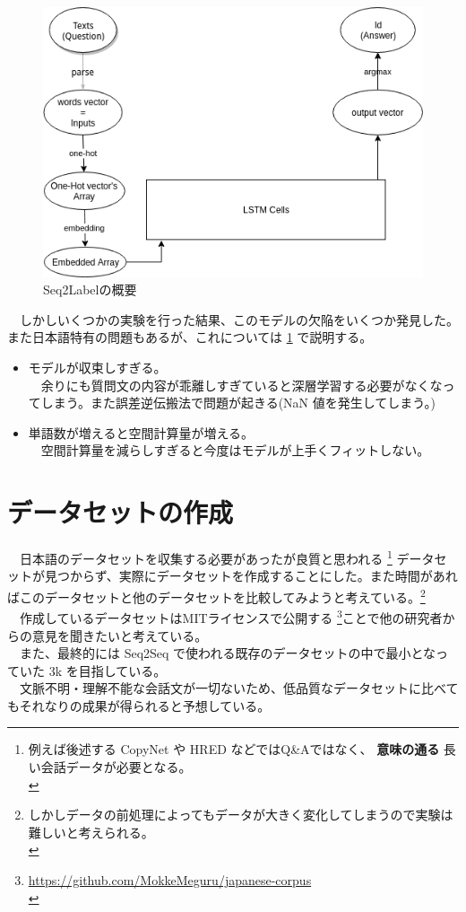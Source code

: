 \documentclass{scrartcl}
\begin{document}
\begin{figure}[htbp]
\centering
\includegraphics[width=12cm]{./Diagram.png}
\caption{\label{fig:org3d3094e}
Seq2Labelの概要}
\end{figure}

　しかしいくつかの実験を行った結果、このモデルの欠陥をいくつか発見した。また日本語特有の問題もあるが、これについては \ref{sec:orgcb39560} で説明する。\\
\begin{itemize}
\item モデルが収束しすぎる。\\
　余りにも質問文の内容が乖離しすぎていると深層学習する必要がなくなってしまう。また誤差逆伝搬法で問題が起きる(NaN 値を発生してしまう。)\\
\item 単語数が増えると空間計算量が増える。\\
　空間計算量を減らしすぎると今度はモデルが上手くフィットしない。\\
\end{itemize}

\section{データセットの作成}
\label{sec:orgcb39560}
　日本語のデータセットを収集する必要があったが良質と思われる \footnote{例えば後述する CopyNet や HRED などではQ\&Aではなく、 \textbf{意味の通る} 長い会話データが必要となる。\\} データセットが見つからず、実際にデータセットを作成することにした。また時間があればこのデータセットと他のデータセットを比較してみようと考えている。\footnote{しかしデータの前処理によってもデータが大きく変化してしまうので実験は難しいと考えられる。\\}\\
　作成しているデータセットはMITライセンスで公開する \footnote{\url{https://github.com/MokkeMeguru/japanese-corpus}\\}ことで他の研究者からの意見を聞きたいと考えている。\\
　また、最終的には Seq2Seq で使われる既存のデータセットの中で最小となっていた 3k を目指している。\\
　文脈不明・理解不能な会話文が一切ないため、低品質なデータセットに比べてもそれなりの成果が得られると予想している。\\
\end{document}
